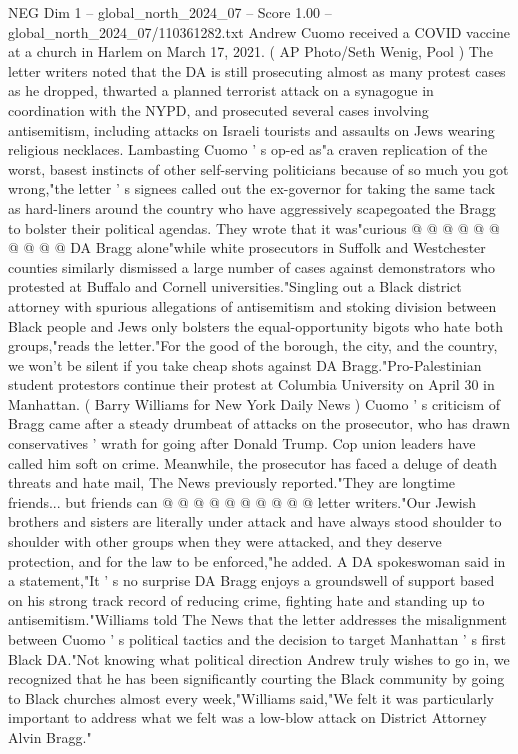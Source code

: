 \begin{textsample}{NEG Dim 1 – global\_north\_2024\_07 – Score 1.00 – global\_north\_2024\_07/110361282.txt}
Andrew Cuomo received a COVID vaccine at a church in Harlem on March 17, 2021. ( AP Photo/Seth Wenig, Pool ) The letter writers noted that the DA is still prosecuting almost as many protest cases as he dropped, thwarted a planned terrorist attack on a synagogue in coordination with the NYPD, and prosecuted several cases involving antisemitism, including attacks on Israeli tourists and assaults on Jews wearing religious necklaces.
Lambasting Cuomo ' s op-ed as"a craven replication of the worst, basest instincts of other self-serving politicians because of so much you got wrong,"the letter ' s signees called out the ex-governor for taking the same tack as hard-liners around the country who have aggressively scapegoated the Bragg to bolster their political agendas.
They wrote that it was"curious @ @ @ @ @ @ @ @ @ @ DA Bragg alone"while white prosecutors in Suffolk and Westchester counties similarly dismissed a large number of cases against demonstrators who protested at Buffalo and Cornell universities."Singling out a Black district attorney with spurious allegations of antisemitism and stoking division between Black people and Jews only bolsters the equal-opportunity bigots who hate both groups,"reads the letter."For the good of the borough, the city, and the country, we won't be silent if you take cheap shots against DA Bragg."Pro-Palestinian student protestors continue their protest at Columbia University on April 30 in Manhattan. ( Barry Williams for New York Daily News ) Cuomo ' s criticism of Bragg came after a steady drumbeat of attacks on the prosecutor, who has drawn conservatives ' wrath for going after Donald Trump.
Cop union leaders have called him soft on crime.
Meanwhile, the prosecutor has faced a deluge of death threats and hate mail, The News previously reported."They are longtime friends... but friends can @ @ @ @ @ @ @ @ @ @ letter writers."Our Jewish brothers and sisters are literally under attack and have always stood shoulder to shoulder with other groups when they were attacked, and they deserve protection, and for the law to be enforced,"he added.
A DA spokeswoman said in a statement,"It ' s no surprise DA Bragg enjoys a groundswell of support based on his strong track record of reducing crime, fighting hate and standing up to antisemitism."Williams told The News that the letter addresses the misalignment between Cuomo ' s political tactics and the decision to target Manhattan ' s first Black DA."Not knowing what political direction Andrew truly wishes to go in, we recognized that he has been significantly courting the Black community by going to Black churches almost every week,"Williams said,"We felt it was particularly important to address what we felt was a low-blow attack on District Attorney Alvin Bragg."

\end{textsample}

